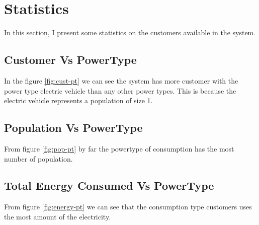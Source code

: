 \section{Statistics}
In this section, I present some statistics on the customers available in the system. 

\subsection {Customer Vs PowerType}

In the figure \ref{fig:cust-pt} we can see the system has more customer with the power type electric vehicle than any other power types. This is because the electric vehicle represents a population of size 1.

\subsection {Population Vs PowerType}
From figure \ref{fig:pop-pt} by far the powertype of consumption has the most number of population.

\subsection {Total Energy Consumed Vs PowerType}
From figure \ref{fig:energy-pt} we can see that the consumption type customers uses the most amount of the electricity.


